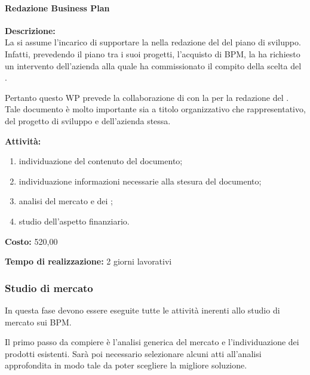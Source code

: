 \paragraph{\bfseries\sffamily{}Redazione Business Plan}
\begin{description}
\item{\bfseries Descrizione:}\\
La \team si assume l'incarico di supportare la \customer nella redazione  del  del piano di sviluppo. Infatti, prevedendo il piano tra i suoi progetti, l'acquisto di \sw BPM, la \customer ha richiesto un intervento dell'azienda alla quale ha commissionato il compito della scelta del \sw.

Pertanto questo WP prevede la collaborazione di \team con la \customer per la redazione del . Tale documento è molto importante sia a titolo organizzativo che rappresentativo, del progetto di sviluppo e dell'azienda stessa.
\item  {\bfseries Attività:}
\begin{enumerate}
	\item individuazione del contenuto del documento;
	\item individuazione informazioni necessarie alla stesura del documento;
	\item analisi del mercato e dei ;
	\item studio dell'aspetto finanziario.
\end{enumerate}
\item{\bfseries Costo:} \text{\euro} 520,00 
\item{\bfseries Tempo di realizzazione:} 2 giorni lavorativi
\end{description}

\subsubsection{Studio di mercato}
In questa fase devono essere eseguite tutte le attività inerenti allo studio di mercato sui \sw BPM\@.

Il primo passo da compiere è l'analisi generica del mercato e l'individuazione dei prodotti esistenti. Sarà poi necessario selezionare alcuni \sw atti all'analisi approfondita in modo tale da poter scegliere la migliore soluzione. 

